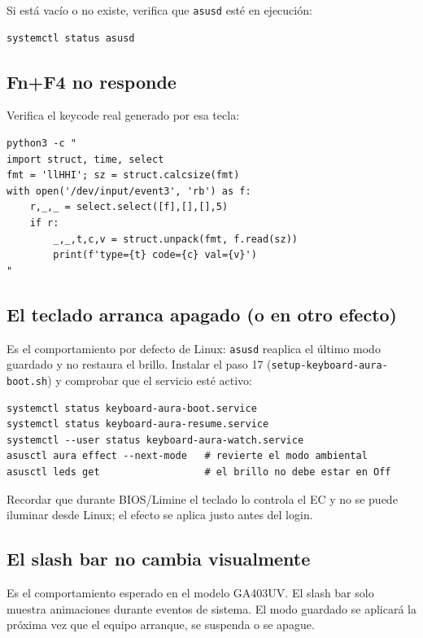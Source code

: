\documentclass[12pt,a4paper]{article}
\begin{document}
Si está vacío o no existe, verifica que \texttt{asusd} esté en ejecución:

\begin{lstlisting}[style=bash]
systemctl status asusd
\end{lstlisting}

\subsection*{Fn+F4 no responde}

Verifica el keycode real generado por esa tecla:

\begin{lstlisting}[style=bash]
python3 -c "
import struct, time, select
fmt = 'llHHI'; sz = struct.calcsize(fmt)
with open('/dev/input/event3', 'rb') as f:
    r,_,_ = select.select([f],[],[],5)
    if r:
        _,_,t,c,v = struct.unpack(fmt, f.read(sz))
        print(f'type={t} code={c} val={v}')
"
\end{lstlisting}

\subsection*{El teclado arranca apagado (o en otro efecto)}

Es el comportamiento por defecto de Linux: \texttt{asusd} reaplica el último
modo guardado y no restaura el brillo. Instalar el paso 17
(\texttt{setup-keyboard-aura-boot.sh}) y comprobar que el servicio esté activo:

\begin{lstlisting}[style=bash]
systemctl status keyboard-aura-boot.service
systemctl status keyboard-aura-resume.service
systemctl --user status keyboard-aura-watch.service
asusctl aura effect --next-mode   # revierte el modo ambiental
asusctl leds get                  # el brillo no debe estar en Off
\end{lstlisting}

Recordar que durante BIOS/Limine el teclado lo controla el EC y no se puede
iluminar desde Linux; el efecto se aplica justo antes del login.

\subsection*{El slash bar no cambia visualmente}

Es el comportamiento esperado en el modelo GA403UV. El slash bar solo muestra
animaciones durante eventos de sistema. El modo guardado se aplicará la próxima
vez que el equipo arranque, se suspenda o se apague.
\end{document}
